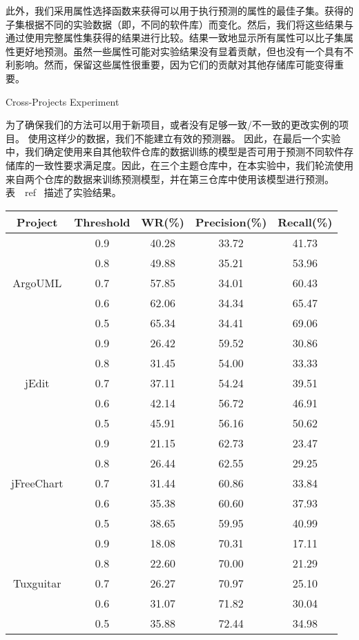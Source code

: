 此外，我们采用属性选择函数来获得可以用于执行预测的属性的最佳子集。获得的子集根据不同的实验数据（即，不同的软件库）而变化。然后，我们将这些结果与通过使用完整属性集获得的结果进行比较。结果一致地显示所有属性可以比子集属性更好地预测。虽然一些属性可能对实验结果没有显着贡献，但也没有一个具有不利影响。然而，保留这些属性很重要，因为它们的贡献对其他存储库可能变得重要。

{Cross-Projects Experiment}

为了确保我们的方法可以用于新项目，或者没有足够一致/不一致的更改实例的项目。 使用这样少的数据，我们不能建立有效的预测器。 因此，在最后一个实验中，我们确定使用来自其他软件仓库的数据训练的模型是否可用于预测不同软件存储库的一致性要求满足度。因此，在三个主题仓库中，在本实验中，我们轮流使用来自两个仓库的数据来训练预测模型，并在第三仓库中使用该模型进行预测。表~\ ref {}~描述了实验结果。

\begin{table}[htbp]
\vspace{0.5em}\centering\wuhao
\begin{tabular}{ccccc}
\toprule[1.5pt]
{\textbf{Project}}&{\textbf{Threshold}}&{\textbf{WR(\%)}}&{\textbf{Precision(\%)}}&{\textbf{Recall(\%)}}\\

\midrule[1pt]
\multirow{5}{*}{ArgoUML}
&0.9&	40.28&	33.72&	41.73\\
&0.8&	49.88&	35.21&	53.96\\
&0.7&	57.85&	34.01&	60.43\\
&0.6&	62.06&	34.34&	65.47\\
&0.5&	65.34&	34.41&	69.06\\
\hline
\multirow{5}{*}{jEdit}
&0.9&	26.42&	59.52&	30.86\\
&0.8&	31.45&	54.00&	33.33\\
&0.7&	37.11&	54.24&	39.51\\
&0.6&	42.14&	56.72&	46.91\\
&0.5&	45.91&	56.16&	50.62\\
\hline
\multirow{5}{*}{jFreeChart}
&0.9&	21.15&	62.73&	23.47\\
&0.8&	26.44&	62.55&	29.25\\
&0.7&	31.44&	60.86&	33.84\\
&0.6&	35.38&	60.60&	37.93\\
&0.5&	38.65&	59.95&	40.99\\
\hline
\multirow{5}{*}{Tuxguitar}
&0.9&	18.08&	70.31&	17.11\\
&0.8&	22.60&	70.00&	21.29\\
&0.7&	26.27&	70.97&	25.10\\
&0.6&	31.07&	71.82&	30.04\\
&0.5&	35.88&	72.44&	34.98\\
\bottomrule[1.5pt]
\end{tabular}
\end{table}

